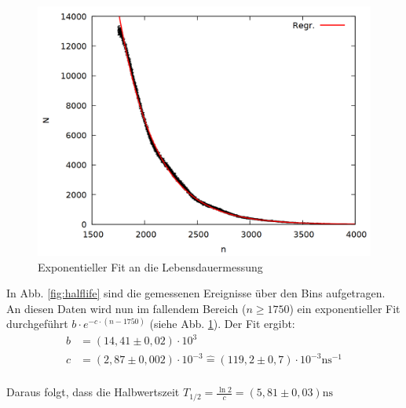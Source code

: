 \begin{figure}[h]
\centering
\includegraphics[width=0.7\linewidth]{data/uebernacht2.png}
\caption{Exponentieller Fit an die Lebensdauermessung}
\label{fig:halflife2}
\end{figure}

In Abb. \ref{fig:halflife} sind die gemessenen Ereignisse über den Bins aufgetragen. An diesen Daten wird nun im fallendem Bereich ($n \geq 1750$) ein exponentieller Fit durchgeführt $b\cdot e^{-c\cdot (n-1750)}$ (siehe Abb. \ref{fig:halflife2}). Der Fit ergibt:
\begin{align*}
b &= (14,41 \pm 0,02) \cdot 10^3\\
c &= (2,87 \pm 0,002) \cdot 10^{-3} \mathrel{\widehat{=}} (119,2 \pm 0,7)\cdot 10^{-3} \si{\nano\second}^{-1}\\
\end{align*}

Daraus folgt, dass die Halbwertszeit $T_{1/2} = \frac{\ln{2}}{c} = (5,81 \pm 0,03) \si{\nano\second}$
